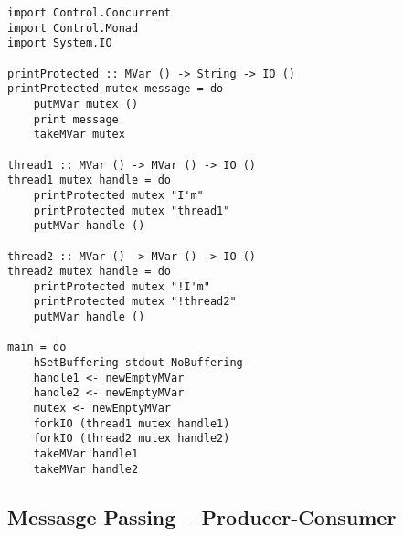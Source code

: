 \documentclass[twocolumn,landscape,10pt]{article}
\theoremstyle{definition}
\begin{document}
\begin{lstlisting}[Haskell]
import Control.Concurrent
import Control.Monad
import System.IO

printProtected :: MVar () -> String -> IO ()
printProtected mutex message = do
    putMVar mutex ()
    print message
    takeMVar mutex

thread1 :: MVar () -> MVar () -> IO ()
thread1 mutex handle = do
    printProtected mutex "I'm"
    printProtected mutex "thread1"
    putMVar handle ()

thread2 :: MVar () -> MVar () -> IO ()
thread2 mutex handle = do
    printProtected mutex "!I'm"
    printProtected mutex "!thread2"
    putMVar handle ()

main = do
    hSetBuffering stdout NoBuffering
    handle1 <- newEmptyMVar
    handle2 <- newEmptyMVar
    mutex <- newEmptyMVar
    forkIO (thread1 mutex handle1)
    forkIO (thread2 mutex handle2)
    takeMVar handle1
    takeMVar handle2
\end{lstlisting} 

\subsection{Messasge Passing -- Producer-Consumer}
\end{document}
